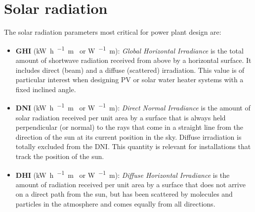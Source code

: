 \section{Solar radiation}

The solar radiation parameters most critical for power plant design are:
\begin{itemize}
\item \textbf{GHI} (\si{\kilo\watt\hour\per\squared\metre\year} or \si{\watt\per\squared\metre}): \emph{Global Horizontal Irradiance} is the total amount of shortwave radiation received from above by a horizontal surface. It includes direct (beam) and a diffuse (scattered) irradiation. This value is of particular interest when designing PV or solar water heater systems with a fixed inclined angle.
\item \textbf{DNI} (\si{\kilo\watt\hour\per\squared\metre\year} or \si{\watt\per\squared\metre}): \emph{Direct Normal Irradiance} is the amount of solar radiation received per unit area by a surface that is always held perpendicular (or normal) to the rays that come in a straight line from the direction of the sun at its current position in the sky. Diffuse irradiation is totally excluded from the DNI. This quantity is relevant for installations that track the position of the sun.
\item \textbf{DHI} (\si{\kilo\watt\hour\per\squared\metre\year} or \si{\watt\per\squared\metre}): \emph{Diffuse Horizontal Irradiance} is the amount of radiation received per unit area by a surface that does not arrive on a direct path from the sun, but has been scattered by molecules and particles in the atmosphere and comes equally from all directions.
\end{itemize}
